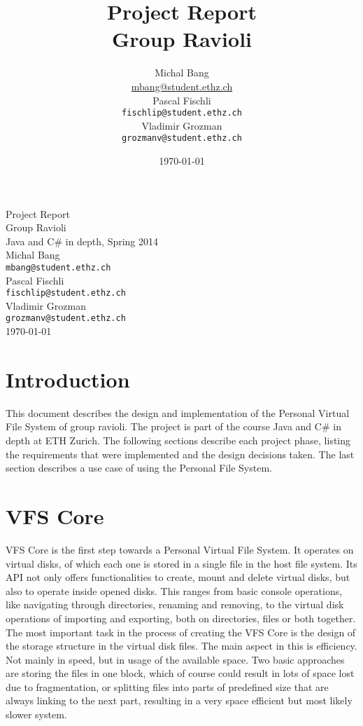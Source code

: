 \documentclass[11pt]{article}
\title{Project Report\\Group Ravioli}
\author{\large Michal Bang\\\small\href{mailto:mbang@student.ethz.ch}{mbang@student.ethz.ch}\\\large Pascal Fischli\\\small\texttt{fischlip@student.ethz.ch}\\\large Vladimir Grozman\\\small\texttt{grozmanv@student.ethz.ch}}
\date{\today}
\begin{document}
\begin{center}



\LARGE Project Report\\Group Ravioli \\[0.5cm]

\Large Java and C\# in depth, Spring 2014 \\[0.5cm]

\large Michal Bang\\\small\texttt{mbang@student.ethz.ch}\\[0.05cm]
\large Pascal Fischli\\\small\texttt{fischlip@student.ethz.ch}\\[0.05cm]
\large Vladimir Grozman\\\small\texttt{grozmanv@student.ethz.ch}\\[0.5cm]

{\large \today}\\[1.5cm]

\end{center}


\section{Introduction}
This document describes the design and implementation of the Personal Virtual File System of group ravioli. The project is part of the course Java and C\# in depth at ETH Zurich. The following sections describe each project phase, listing the requirements that were implemented and the design decisions taken. The last section describes a use case of using the Personal File System.

\section{VFS Core}
VFS Core is the first step towards a Personal Virtual File System. It operates on virtual disks, of which each one is stored in a single file in the host file system. Its API not only offers functionalities to create, mount and delete virtual disks, but also to operate inside opened disks. This ranges from basic console operations, like navigating through directories, renaming and removing, to the virtual disk operations of importing and exporting, both on directories, files or both together.\newline
The most important task in the process of creating the VFS Core is the design of the storage structure in the virtual disk files. The main aspect in this is efficiency. Not mainly in speed, but in usage of the available space. Two basic approaches are storing the files in one block, which of course could result in lots of space lost due to fragmentation, or splitting files into parts of predefined size that are always linking to the next part, resulting in a very space efficient but most likely slower system.
\end{document}
